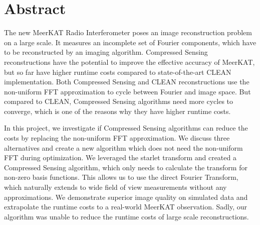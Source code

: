 \section*{Abstract}
The new MeerKAT Radio Interferometer poses an image reconstruction problem on a large scale. It measures an incomplete set of Fourier components, which have to be reconstructed by an imaging algorithm.  Compressed Sensing reconstructions have the potential to improve the effective accuracy of MeerKAT, but so far have higher runtime costs compared to state-of-the-art CLEAN implementation. Both Compressed Sensing and CLEAN reconstructions use the non-uniform FFT approximation to cycle between Fourier and image space. But compared to CLEAN, Compressed Sensing algorithms need more cycles to converge, which is one of the reasons why they have higher runtime costs.

In this project, we investigate if Compressed Sensing algorithms can reduce the costs by replacing the non-uniform FFT approximation. We discuss three alternatives and create a new algorithm which does not need the non-uniform FFT during optimization. We leveraged the starlet transform and created a Compressed Sensing algorithm, which only needs to calculate the transform for non-zero basis functions. This allows us to use the direct Fourier Transform, which naturally extends to wide field of view measurements without any approximations. We demonstrate superior image quality on simulated data and extrapolate the runtime costs to a real-world MeerKAT observation. Sadly, our algorithm was unable to reduce the runtime costs of large scale reconstructions.

